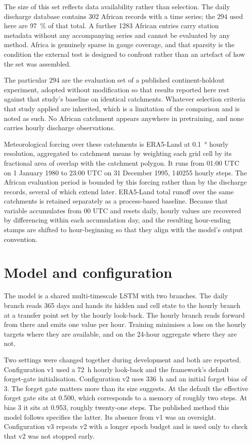 \documentclass[11pt,a4paper]{article}
\begin{document}
The size of this set reflects data availability rather than selection. The daily discharge
database contains \num{302} African records with a time series; the \num{294} used here are
\SI{97}{\percent} of that total. A further \num{1283} African entries carry station metadata
without any accompanying series and cannot be evaluated by any method. Africa is genuinely
sparse in gauge coverage, and that sparsity is the condition the external test is designed to
confront rather than an artefact of how the set was assembled.

The particular \num{294} are the evaluation set of a published continent-holdout experiment,
adopted without modification so that results reported here rest against that study's baseline
on identical catchments. Whatever selection criteria that study applied are inherited, which
is a limitation of the comparison and is noted as such. No African catchment appears anywhere
in pretraining, and none carries hourly discharge observations.

Meteorological forcing over these catchments is ERA5-Land at \SI{0.1}{\degree} hourly
resolution, aggregated to catchment means by weighting each grid cell by its fractional area
of overlap with the catchment polygon. It runs from 01:00 UTC on 1 January 1980 to 23:00 UTC
on 31 December 1995, \num{140255} hourly steps. The African evaluation period is bounded by
this forcing rather than by the discharge records, several of which extend later. ERA5-Land total runoff over
the same catchments is retained separately as a process-based baseline. Because that variable
accumulates from 00 UTC and resets daily, hourly values are recovered by differencing within
each accumulation day, and the resulting hour-ending stamps are shifted to hour-beginning so
that they align with the model's output convention.

\section{Model and configuration}\label{sec:model}
The model is a shared multi-timescale LSTM with two branches. The daily branch reads 365 days and hands its hidden and cell state to the hourly branch at a transfer point set by the hourly look-back. The hourly branch reads forward from there and emits one value per hour. Training minimises a loss on the hourly targets where they are available, and on the 24-hour aggregate where they are not.

Two settings were changed together during development and both are reported. Configuration v1 used a \SI{72}{\hour} hourly look-back and the framework's default forget-gate initialisation. Configuration v2 uses \SI{336}{\hour} and an initial forget bias of 3. The forget gate matters more than its size suggests. At the default the effective forget gate sits at 0.500, which corresponds to a memory of roughly two steps. At bias 3 it sits at 0.953, roughly twenty-one steps. The published method this model follows specifies the latter. Its absence from v1 was an oversight. Configuration v3 repeats v2 with a longer epoch budget and is used only to check that v2 was not stopped early.
\end{document}
